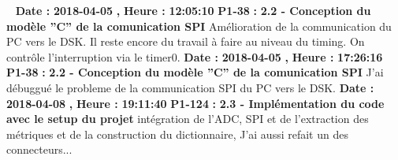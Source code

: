 \documentclass{article}%
\begin{document}
~\newline%
\newline%
%
\textbf{Date : }%
\textbf{2018{-}04{-}05}%
\textbf{,}%
\textbf{ Heure : }%
\textbf{12:05:10}%
\newline%
%
\textbf{P1{-}38 }%
\textbf{ : }%
\textbf{ 2.2 {-} Conception du modèle ''C'' de la comunication SPI}%
\newline%
\newline%
%
Amélioration de la communication du PC vers le DSK. Il reste encore du travail à faire au niveau du timing. On contrôle l'interruption via le timer0.\newline%
\newline%
%
\textbf{Date : }%
\textbf{2018{-}04{-}05}%
\textbf{,}%
\textbf{ Heure : }%
\textbf{17:26:16}%
\newline%
%
\textbf{P1{-}38 }%
\textbf{ : }%
\textbf{ 2.2 {-} Conception du modèle ''C'' de la comunication SPI}%
\newline%
\newline%
%
J'ai débuggué le probleme de la communication SPI du PC vers le DSK.\newline%
\newline%
%
\textbf{Date : }%
\textbf{2018{-}04{-}08}%
\textbf{,}%
\textbf{ Heure : }%
\textbf{19:11:40}%
\newline%
%
\textbf{P1{-}124 }%
\textbf{ : }%
\textbf{ 2.3 {-} Implémentation du code avec le setup du projet}%
\newline%
\newline%
%
intégration de l'ADC, SPI et de l'extraction des métriques et de la construction du dictionnaire, J'ai aussi refait un des connecteurs...\newline%
\newline%
%
\newpage

%
\end{document}
